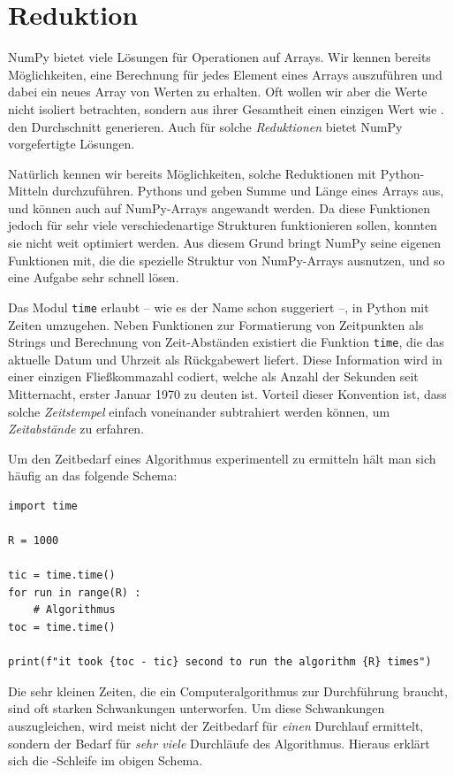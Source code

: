 \section{Reduktion}
NumPy bietet viele Lösungen für Operationen auf Arrays. Wir kennen bereits Möglichkeiten, eine Berechnung für jedes Element eines Arrays auszuführen und dabei ein neues Array von Werten zu erhalten. Oft wollen wir aber die Werte nicht isoliert betrachten, sondern aus ihrer Gesamtheit einen einzigen Wert wie \eg. den Durchschnitt generieren. Auch für solche \emph{Reduktionen} bietet NumPy vorgefertigte Lösungen.

Natürlich kennen wir bereits Möglichkeiten, solche Reduktionen mit Python-Mitteln durchzuführen. Pythons  und  geben Summe und Länge eines Arrays aus, und können auch auf NumPy-Arrays angewandt werden. Da diese Funktionen jedoch für sehr viele verschiedenartige Strukturen funktionieren sollen, konnten sie nicht weit optimiert werden. Aus diesem Grund bringt NumPy seine eigenen Funktionen mit, die die spezielle Struktur von NumPy-Arrays ausnutzen, und so eine Aufgabe sehr schnell lösen.

\begin{hintbox}
Das Modul \texttt{time} erlaubt -- wie es der Name schon suggeriert --, in Python mit Zeiten umzugehen. Neben Funktionen zur Formatierung von Zeitpunkten als Strings und Berechnung von Zeit-Abständen existiert die Funktion \texttt{time}, die das aktuelle Datum und Uhrzeit als Rückgabewert liefert. Diese Information wird in einer einzigen Fließkommazahl codiert, welche als Anzahl der Sekunden seit Mitternacht, erster Januar 1970 zu deuten ist. Vorteil dieser Konvention ist, dass solche \emph{Zeitstempel} einfach voneinander subtrahiert werden können, um \emph{Zeitabstände} zu erfahren.

Um den Zeitbedarf eines Algorithmus experimentell zu ermitteln hält man sich häufig an das folgende Schema:
\begin{codebox}
\begin{verbatim}
import time

R = 1000

tic = time.time()
for run in range(R) :
    # Algorithmus
toc = time.time()

print(f"it took {toc - tic} second to run the algorithm {R} times")
\end{verbatim}
\end{codebox}

Die sehr kleinen Zeiten, die ein Computeralgorithmus zur Durchführung braucht, sind oft starken Schwankungen unterworfen. Um diese Schwankungen auszugleichen, wird meist nicht der Zeitbedarf für \emph{einen} Durchlauf ermittelt, sondern der Bedarf für \emph{sehr viele} Durchläufe des Algorithmus. Hieraus erklärt sich die -Schleife im obigen Schema.
\end{hintbox}

